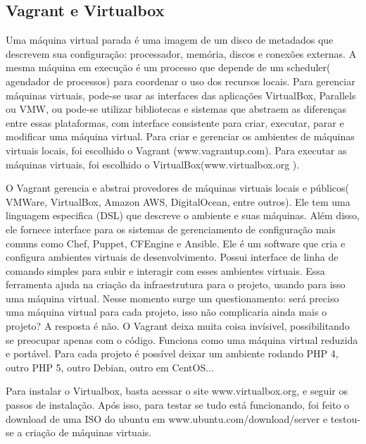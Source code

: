 \subsection{Vagrant e Virtualbox}

Uma máquina virtual parada é uma imagem de um disco 
de metadados que descrevem sua configuração: processador, 
memória, discos e conexões externas. A mesma máquina em 
execução é um processo que depende de um scheduler( agendador 
de processos) para coordenar o uso dos recursos locais. Para 
gerenciar máquinas virtuais, pode-se usar as interfaces das 
aplicações VirtualBox, Parallels ou VMW, ou pode-se utilizar 
bibliotecas e sistemas que abstraem as diferenças entre 
essas plataformas, com interface consistente para criar, 
executar, parar e modificar uma máquina virtual.
Para criar e gerenciar os ambientes de máquinas virtuais 
locais, foi escolhido o Vagrant (www.vagrantup.com). 
Para executar as máquinas virtuais, foi escolhido o 
VirtualBox(www.virtualbox.org ).

O Vagrant gerencia e abstrai provedores de máquinas 
virtuais locais e públicos( VMWare, VirtualBox, Amazon 
AWS, DigitalOcean, entre outros). Ele tem uma linguagem 
especifica (DSL) que descreve o ambiente e suas máquinas. 
Além disso, ele fornece interface para os sistemas de 
gerenciamento de configuração mais comuns como Chef, 
Puppet, CFEngine e Ansible. Ele é um software que cria e 
configura ambientes 
virtuais de desenvolvimento. Possui interface de 
linha de comando simples para subir e interagir 
com esses ambientes virtuais. Essa ferramenta ajuda na 
criação da infraestrutura para o projeto, usando para 
isso uma máquina virtual. Nesse momento surge um questionamento: 
será preciso uma máquina virtual para cada projeto, isso não 
complicaria ainda mais o projeto? A resposta é não. O Vagrant 
deixa muita coisa invísivel, possibilitando se preocupar apenas 
com o código. Funciona como uma máquina virtual reduzida e 
portável. Para cada projeto é possível deixar 
um ambiente rodando PHP 4, outro PHP 5, outro Debian, outro em 
CentOS...

Para instalar o Virtualbox, basta acessar o site  
www.virtualbox.org, e seguir os passos de instalação. Após isso, 
para testar se tudo está funcionando, foi feito o download de 
uma ISO do ubuntu em www.ubuntu.com/download/server e testou-se 
a criação de máquinas virtuais.

